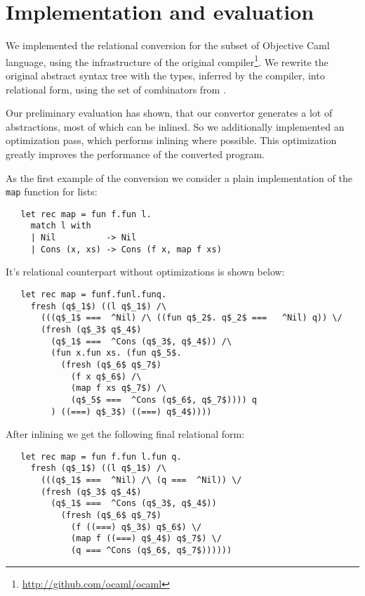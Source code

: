 \section{Implementation and evaluation}
\label{evaluation}

We implemented the relational conversion for the subset of Objective Caml language, using the infrastructure of the 
original compiler\footnote{\url{http://github.com/ocaml/ocaml}}. We rewrite the original abstract syntax tree with
the types, inferred by the compiler, into relational form, using the set of combinators from \ocanren. 

Our preliminary evaluation has shown, that our convertor generates a lot of abstractions, most of which can be inlined.
So we additionally implemented an optimization pass, which performs inlining where possible. This optimization
greatly improves the performance of the converted program.

As the first example of the conversion we consider a plain implementation of the \lstinline|map| function for lists:

\begin{lstlisting}
   let rec map = fun f.fun l.
     match l with
     | Nil          -> Nil
     | Cons (x, xs) -> Cons (f x, map f xs)
\end{lstlisting}

It's relational counterpart without optimizations is shown below:

\begin{lstlisting}
   let rec map = funf.funl.funq.
     fresh (q$_1$) ((l q$_1$) /\
       (((q$_1$ ===  ^Nil) /\ ((fun q$_2$. q$_2$ ===   ^Nil) q)) \/
       (fresh (q$_3$ q$_4$)
         (q$_1$ ===  ^Cons (q$_3$, q$_4$)) /\
         (fun x.fun xs. (fun q$_5$.
           (fresh (q$_6$ q$_7$) 
             (f x q$_6$) /\
             (map f xs q$_7$) /\
             (q$_5$ ===  ^Cons (q$_6$, q$_7$)))) q
         ) ((===) q$_3$) ((===) q$_4$))))
\end{lstlisting}

After inlining we get the following final relational form:

\begin{lstlisting}
   let rec map = fun f.fun l.fun q.
     fresh (q$_1$) ((l q$_1$) /\
       (((q$_1$ ===  ^Nil) /\ (q ===  ^Nil)) \/
       (fresh (q$_3$ q$_4$)
         (q$_1$ ===  ^Cons (q$_3$, q$_4$))
           (fresh (q$_6$ q$_7$)
             (f ((===) q$_3$) q$_6$) \/
             (map f ((===) q$_4$) q$_7$) \/
             (q === ^Cons (q$_6$, q$_7$))))))
\end{lstlisting}

